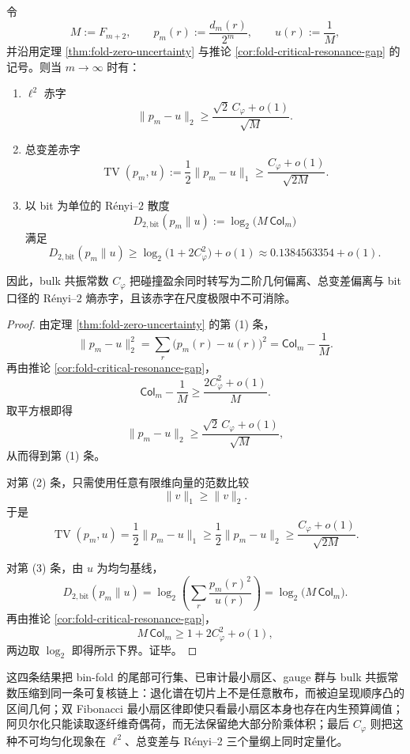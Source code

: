 \begin{theorem}\label{thm:gut-cphi-forces-l2-tv-renyi2-deficit}
令
\[
M:=F_{m+2},
\qquad
p_m(r):=\frac{d_m(r)}{2^m},
\qquad
u(r):=\frac{1}{M},
\]
并沿用定理 \ref{thm:fold-zero-uncertainty} 与推论 \ref{cor:fold-critical-resonance-gap} 的记号。则当 \(m\to\infty\) 时有：
\begin{enumerate}
  \item \(\ell^2\) 赤字
  \[
  \|p_m-u\|_2
  \ge
  \frac{\sqrt2\,C_\varphi+o(1)}{\sqrt M}.
  \]
  \item 总变差赤字
  \[
  \operatorname{TV}(p_m,u)
  :=
  \frac12\|p_m-u\|_1
  \ge
  \frac{C_\varphi+o(1)}{\sqrt{2M}}.
  \]
  \item 以 bit 为单位的 Rényi--\(2\) 散度
  \[
  D_{2,\mathrm{bit}}(p_m\|u)
  :=
  \log_2\!\bigl(M\,\mathsf{Col}_m\bigr)
  \]
  满足
  \[
  D_{2,\mathrm{bit}}(p_m\|u)
  \ge
  \log_2\!\bigl(1+2C_\varphi^2\bigr)+o(1)
  \approx 0.1384563354+o(1).
  \]
\end{enumerate}
因此，bulk 共振常数 \(C_\varphi\) 把碰撞盈余同时转写为二阶几何偏离、总变差偏离与 bit 口径的 Rényi--\(2\) 熵赤字，且该赤字在尺度极限中不可消除。
\end{theorem}
\begin{proof}
由定理 \ref{thm:fold-zero-uncertainty} 的第 (1) 条，
\[
\|p_m-u\|_2^2
=
\sum_r\bigl(p_m(r)-u(r)\bigr)^2
=
\mathsf{Col}_m-\frac{1}{M}.
\]
再由推论 \ref{cor:fold-critical-resonance-gap}，
\[
\mathsf{Col}_m-\frac{1}{M}
\ge
\frac{2C_\varphi^2+o(1)}{M}.
\]
取平方根即得
\[
\|p_m-u\|_2
\ge
\frac{\sqrt2\,C_\varphi+o(1)}{\sqrt M},
\]
从而得到第 (1) 条。

对第 (2) 条，只需使用任意有限维向量的范数比较
\[
\|v\|_1\ge \|v\|_2.
\]
于是
\[
\operatorname{TV}(p_m,u)
=
\frac12\|p_m-u\|_1
\ge
\frac12\|p_m-u\|_2
\ge
\frac{C_\varphi+o(1)}{\sqrt{2M}}.
\]

对第 (3) 条，由 \(u\) 为均匀基线，
\[
D_{2,\mathrm{bit}}(p_m\|u)
=
\log_2\!\left(\sum_r\frac{p_m(r)^2}{u(r)}\right)
=
\log_2\!\bigl(M\,\mathsf{Col}_m\bigr).
\]
再由推论 \ref{cor:fold-critical-resonance-gap}，
\[
M\,\mathsf{Col}_m\ge 1+2C_\varphi^2+o(1),
\]
两边取 \(\log_2\) 即得所示下界。证毕。
\end{proof}

这四条结果把 bin-fold 的尾部可行集、已审计最小扇区、gauge 群与 bulk 共振常数压缩到同一条可复核链上：退化谱在切片上不是任意散布，而被迫呈现顺序凸的区间几何；双 Fibonacci 最小扇区律即使只看最小扇区本身也存在内生预算阈值；阿贝尔化只能读取逐纤维奇偶荷，而无法保留绝大部分阶乘体积；最后 \(C_\varphi\) 则把这种不可均匀化现象在 \(\ell^2\)、总变差与 Rényi--\(2\) 三个量纲上同时定量化。
